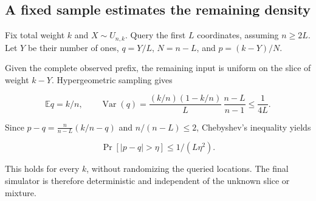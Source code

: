 \subsection{A fixed sample estimates the remaining
density}\label{exch:sec-4}

Fix total weight \(k\) and \(X\sim U_{n,k}\). Query the first \(L\)
coordinates, assuming \(n\ge2L\). Let \(Y\) be their number of ones,
\(q=Y/L\), \(N=n-L\), and \(p=(k-Y)/N\).

Given the complete observed prefix, the remaining input is uniform on
the slice of weight \(k-Y\). Hypergeometric sampling gives

\[
\mathbb E q=k/n,\qquad
\operatorname{Var}(q)=\frac{(k/n)(1-k/n)}L\,\frac{n-L}{n-1}\le\frac1{4L}.
\]

Since \(p-q=\frac{n}{n-L}(k/n-q)\) and \(n/(n-L)\le2\), Chebyshev's
inequality yields

\[
\Pr[|p-q|>\eta]\le1/(L\eta^2).
\]

This holds for every \(k\), without randomizing the queried locations.
The final simulator is therefore deterministic and independent of the
unknown slice or mixture.
